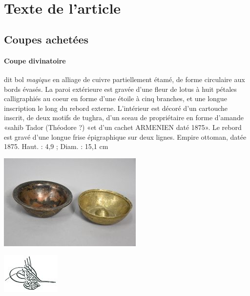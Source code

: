 \section{Texte de l'article}


\subsection{Coupes achetées}


\paragraph{Coupe divinatoire} dit bol \textit{magique} en alliage de cuivre partiellement étamé, de forme circulaire aux bords évasés. La paroi extérieure est gravée d'une fleur de lotus à huit pétales calligraphiés au coeur en forme d'une étoile à cinq branches, et une longue inscription le long du rebord externe. L'intérieur est décoré d'un cartouche inscrit, de deux motifs de tughra, d'un sceau de propriétaire en forme d'amande «sahib Tador (Théodore ?) «et d'un cachet ARMENIEN daté 1875». Le rebord est gravé d'une longue frise épigraphique sur deux lignes. Empire ottoman, datée 1875.
Haut. : 4,9 ; Diam. : 15,1 cm

\includegraphics[width=\textwidth]{GénéralISTR/Image/bolsmagiques.jpeg}

\includegraphics[]{GénéralISTR/Image/Tughra_of_Abdülaziz 1861-76.jpeg}

